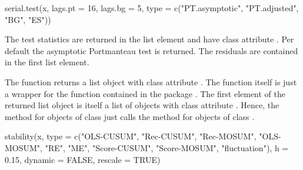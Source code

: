 \documentclass[nojss]{jss}
\begin{document}
\begin{CodeInput}
serial.test(x, lags.pt = 16, lags.bg = 5,
  type = c("PT.asymptotic", "PT.adjusted", "BG", "ES"))  
\end{CodeInput}  
The test statistics are returned in the list element  and
have class attribute . Per default the asymptotic
Portmanteau test is returned. The residuals are contained in the first
list element.

The function  returns a list object with class
attribute . The function itself is just a wrapper for
the function  contained in the package 
\citep[see][for a detailed exposition of the package's
capabilities]{strucchange}.  The first element of the returned list
object is itself a list of objects with class attribute . Hence, the
 method for objects of class  just calls the
 method for objects of class .
\begin{CodeInput}
stability(x, type = c("OLS-CUSUM", "Rec-CUSUM", "Rec-MOSUM", 
  "OLS-MOSUM", "RE", "ME", "Score-CUSUM", "Score-MOSUM", "fluctuation"), 
  h = 0.15, dynamic = FALSE, rescale = TRUE) 
\end{CodeInput}  
\end{document}
